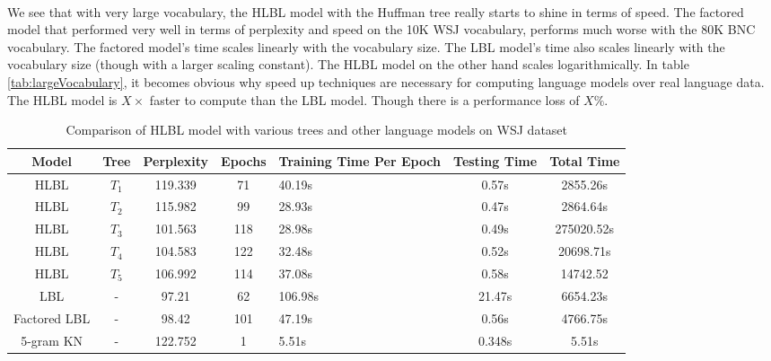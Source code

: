 \documentclass[12pt]{ociamthesis}  %
\newcommand{\ra}[1]{\renewcommand{\arraystretch}{#1}}
\begin{document}
\paragraph{}
We see that with very large vocabulary, the HLBL model with the Huffman tree really starts to shine in terms of speed. The factored model that performed very well in terms of perplexity and speed on the 10K WSJ vocabulary, performs much worse with the 80K BNC vocabulary. The factored model's time scales linearly with the vocabulary size. The LBL model's time also scales linearly with the vocabulary size (though with a larger scaling constant). The HLBL model on the other hand scales logarithmically. In table \ref{tab:largeVocabulary}, it becomes obvious why speed up techniques are necessary for computing language models over real language data. The HLBL model is $X\times$ faster to compute than the LBL model. Though there is a performance loss of $X\%$.

\begin{table*} \centering
\ra{1.3}
\begin{tabular}{@{}ccccC{2cm}cc@{}}\toprule
Model & Tree & Perplexity & Epochs & Training Time Per Epoch & Testing Time & Total Time\\ 
\midrule
 HLBL & $T_1$ &119.339 & 71& 40.19s & 0.57s& 2855.26s\\
 HLBL & $T_2$ &115.982 & 99& 28.93s & 0.47s & 2864.64s\\
 HLBL & $T_3$ &101.563 & 118& 28.98s & 0.49s & 275020.52s \\
 HLBL & $T_4$ &104.583 & 122& 32.48s & 0.52s & 20698.71s\\
 HLBL & $T_5$ &106.992 & 114& 37.08s & 0.58s& 14742.52\\
 LBL& - &97.21 &62 &106.98s & 21.47s& 6654.23s\\
 Factored LBL & - &98.42&101 & 47.19s & 0.56s & 4766.75s \\
 5-gram KN & - &122.752& 1 & 5.51s & 0.348s & 5.51s\\
\bottomrule
\end{tabular}
\caption{Comparison of HLBL model with various trees and other language models on WSJ dataset}
\label{tab:languageModelComparison}
\end{table*}
\end{document}
